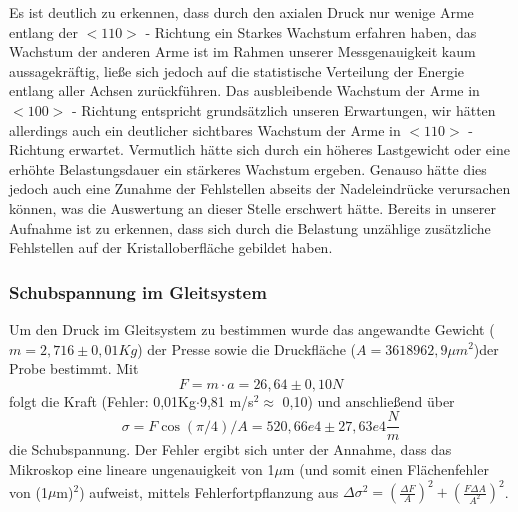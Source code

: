             Es ist deutlich zu erkennen, dass durch den axialen Druck nur wenige Arme entlang der $<110>$ - Richtung ein Starkes Wachstum erfahren haben, das Wachstum der anderen Arme ist im Rahmen unserer
            Messgenauigkeit kaum aussagekräftig, ließe sich jedoch auf die statistische Verteilung der Energie entlang aller Achsen zurückführen.
		Das ausbleibende Wachstum der Arme in $<100>$ - Richtung entspricht grundsätzlich unseren Erwartungen, wir hätten allerdings auch ein deutlicher sichtbares Wachstum der Arme in $<110>$ - Richtung erwartet.
		Vermutlich hätte sich durch ein höheres Lastgewicht oder eine erhöhte Belastungsdauer ein stärkeres Wachstum ergeben. Genauso hätte dies jedoch auch eine Zunahme der Fehlstellen abseits der Nadeleindrücke
		verursachen können, was die Auswertung an dieser Stelle erschwert hätte. Bereits in unserer Aufnahme ist zu erkennen, dass sich durch die Belastung unzählige zusätzliche Fehlstellen auf der Kristalloberfläche
		gebildet haben.
        \subsubsection*{Schubspannung im Gleitsystem}
            Um den Druck im Gleitsystem zu bestimmen wurde das angewandte Gewicht ($m = 2,716\pm0,01 Kg$) der Presse sowie die Druckfläche ($A=3618962,9 \mu m^2$)der Probe bestimmt.
            Mit
            \begin{equation}
                F = m \cdot a = 26,64\pm0,10 N
            \end{equation}
            folgt die Kraft (Fehler: 0,01Kg$\cdot$9,81 m/s$^2 \approx$ 0,10) und anschließend über
            \begin{equation}
                \sigma = F \cos{(\pi / 4)}/ A = 520,66e4 \pm 27,63e4 \frac{N}{m}
            \end{equation}
            die Schubspannung. Der Fehler ergibt sich unter der Annahme, dass das Mikroskop eine lineare ungenauigkeit von 1$\mu$m (und somit einen Flächenfehler von (1$\mu$m)$^2$) aufweist, mittels Fehlerfortpflanzung aus $\Delta \sigma^2 = (\frac{\Delta F}{A})^2 + (\frac{F \Delta A}{A^2})^2$.